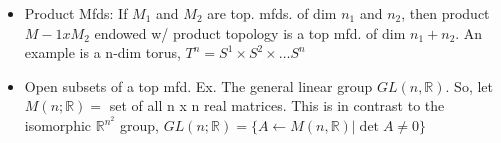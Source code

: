 \documentclass[12pt,letterpaper]{article}
\begin{document}
\begin{itemize}
    \item Product Mfds: If $M_1$ and $M_2$ are top. mfds. of dim $n_1$ and $n_2$, then product $M-1 x M_2$ endowed w/ product topology is a top mfd. of dim $n_1 + n_2$. An example is a n-dim torus, $T^n = S^1 \times S^2 \times \dots S^n$
    
    \item Open subsets of a top mfd. Ex. The general linear group $GL(n, \mathbb{R})$. So, let $M(n;\mathbb{R}) = $ set of all n x n real matrices. This is in contrast to the isomorphic $\mathbb{R}^{n^2}$ group, $GL(n;\mathbb{R}) = \{ A \leftarrow M(n, \mathbb{R}) | \det A \neq 0\}$
    
    
\end{itemize}
\end{document}
